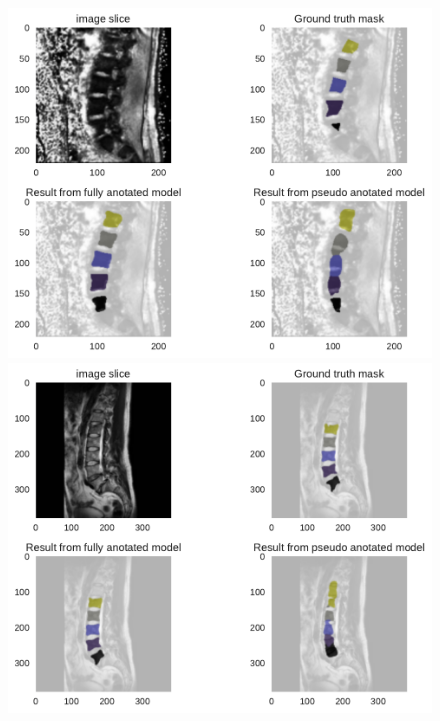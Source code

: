 \begin{figure}
    \centering
    \begin{minipage}{.99\textwidth}
        \includegraphics[width=.99\textwidth]{images/fullvsPseudo_MyoSegmenTUM_024_023.pdf}
    \end{minipage} 
    \vspace{2 mm}
    \begin{minipage}{.99\textwidth}
        \includegraphics[width=.99\textwidth]{images/fullvsPseudo_USiegen_012_024.pdf}
    \end{minipage} 

\end{figure}
